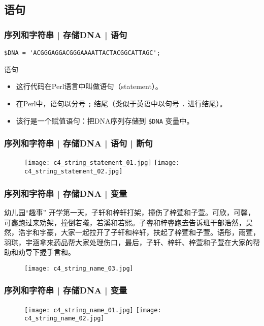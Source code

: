 \subsection{语句}
\begin{frame}[fragile]
  \frametitle{序列和字符串 | 存储DNA | \alert{语句}}
\begin{lstlisting}
$DNA = 'ACGGGAGGACGGGAAAATTACTACGGCATTAGC';
\end{lstlisting}
\pause
\begin{block}{语句}
  \begin{itemize}
    \item 这行代码在Perl语言中叫做语句（statement）。
    \item 在Perl中，语句以分号 \verb|;| 结尾（类似于英语中以句号 \verb|.| 进行结尾）。
    \item 该行是一个赋值语句：把DNA序列存储到 \verb|$DNA| 变量中。
  \end{itemize}
\end{block}
\end{frame}

\begin{frame}
  \frametitle{序列和字符串 | 存储DNA | 语句 | 断句}
  \begin{figure}
    \centering
    \texttt{[image: c4\_string\_statement\_01.jpg]}
    \quad
    \texttt{[image: c4\_string\_statement\_02.jpg]}
  \end{figure}
\end{frame}

\begin{frame}
  \frametitle{序列和字符串 | 存储DNA | 变量}
  \begin{block}{幼儿园“趣事”}
开学第一天，子轩和梓轩打架，撞伤了梓萱和子萱。可欣，可馨，可鑫跑过来劝架，撞倒若曦，若溪和若熙。子睿和梓睿跑去告诉班干部浩然，昊然，浩宇和宇豪，大家一起拉开了子轩和梓轩，扶起了梓萱和子萱。语彤，雨萱，羽琪，宇涵拿来药品帮大家处理伤口，最后，子轩、梓轩、梓萱和子萱在大家的帮助和劝导下握手言和。
  \end{block}
  \begin{figure}
    \centering
    \texttt{[image: c4\_string\_name\_03.jpg]}
  \end{figure}
\end{frame}

\begin{frame}
  \frametitle{序列和字符串 | 存储DNA | 变量}
  \begin{figure}
    \centering
    \texttt{[image: c4\_string\_name\_01.jpg]}
    \quad
    \texttt{[image: c4\_string\_name\_02.jpg]}
  \end{figure}
\end{frame}

